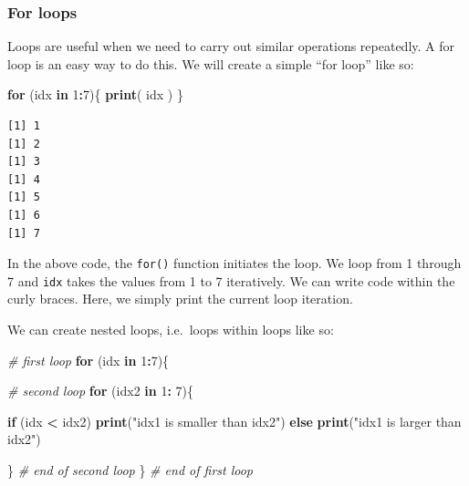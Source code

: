 \documentclass[]{article}
\newenvironment{Shaded}{\begin{snugshade}}{\end{snugshade}}
\newcommand{\CommentTok}[1]{\textcolor[rgb]{0.56,0.35,0.01}{\textit{#1}}}
\newcommand{\ControlFlowTok}[1]{\textcolor[rgb]{0.13,0.29,0.53}{\textbf{#1}}}
\newcommand{\DecValTok}[1]{\textcolor[rgb]{0.00,0.00,0.81}{#1}}
\newcommand{\KeywordTok}[1]{\textcolor[rgb]{0.13,0.29,0.53}{\textbf{#1}}}
\newcommand{\NormalTok}[1]{#1}
\newcommand{\OperatorTok}[1]{\textcolor[rgb]{0.81,0.36,0.00}{\textbf{#1}}}
\newcommand{\StringTok}[1]{\textcolor[rgb]{0.31,0.60,0.02}{#1}}
\begin{document}
\hypertarget{for-loops}{%
\subsubsection{For loops}\label{for-loops}}

Loops are useful when we need to carry out similar operations repeatedly. A for loop is an easy way to do this. We will create a simple ``for loop'' like so:

\begin{Shaded}
\begin{Highlighting}[]
\ControlFlowTok{for}\NormalTok{ (idx }\ControlFlowTok{in} \DecValTok{1}\OperatorTok{:}\DecValTok{7}\NormalTok{)\{}
  \KeywordTok{print}\NormalTok{( idx )}
\NormalTok{\}}
\end{Highlighting}
\end{Shaded}

\begin{verbatim}
[1] 1
[1] 2
[1] 3
[1] 4
[1] 5
[1] 6
[1] 7
\end{verbatim}

In the above code, the \texttt{for()} function initiates the loop. We loop from 1 through 7 and \texttt{idx} takes the values from 1 to 7 iteratively. We can write code within the curly braces. Here, we simply print the current loop iteration.

We can create nested loops, i.e.~loops within loops like so:

\begin{Shaded}
\begin{Highlighting}[]
\CommentTok{# first loop}
\ControlFlowTok{for}\NormalTok{ (idx }\ControlFlowTok{in} \DecValTok{1}\OperatorTok{:}\DecValTok{7}\NormalTok{)\{}
  
  \CommentTok{# second loop}
  \ControlFlowTok{for}\NormalTok{ (idx2 }\ControlFlowTok{in} \DecValTok{1}\OperatorTok{:}\StringTok{ }\DecValTok{7}\NormalTok{)\{}
    
    \ControlFlowTok{if}\NormalTok{ (idx }\OperatorTok{<}\StringTok{ }\NormalTok{idx2) }\KeywordTok{print}\NormalTok{(}\StringTok{"idx1 is smaller than idx2"}\NormalTok{)}
    \ControlFlowTok{else} \KeywordTok{print}\NormalTok{(}\StringTok{"idx1 is larger than idx2"}\NormalTok{)}
    
\NormalTok{  \} }\CommentTok{# end of second loop}
\NormalTok{\} }\CommentTok{# end of first loop}
\end{Highlighting}
\end{Shaded}
\end{document}
